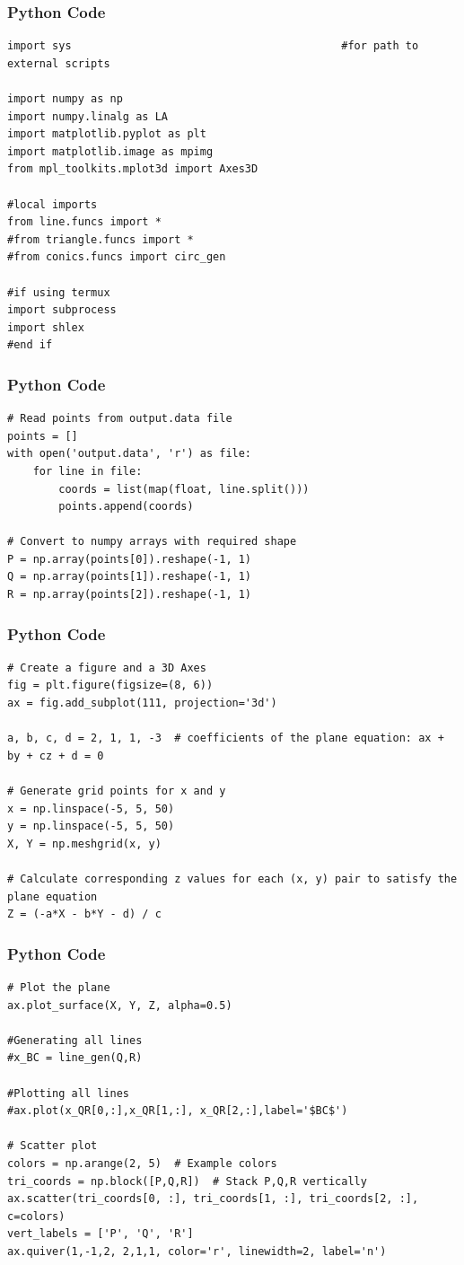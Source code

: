 \documentclass{beamer}
\begin{document}
\begin{frame}[fragile]
    \frametitle{Python Code}
    \begin{lstlisting}
import sys                                          #for path to external scripts

import numpy as np
import numpy.linalg as LA
import matplotlib.pyplot as plt
import matplotlib.image as mpimg
from mpl_toolkits.mplot3d import Axes3D

#local imports
from line.funcs import *
#from triangle.funcs import *
#from conics.funcs import circ_gen

#if using termux
import subprocess
import shlex
#end if
    \end{lstlisting}
\end{frame}

\begin{frame}[fragile]
    \frametitle{Python Code}
    \begin{lstlisting}
# Read points from output.data file
points = []
with open('output.data', 'r') as file:
    for line in file:
        coords = list(map(float, line.split()))
        points.append(coords)

# Convert to numpy arrays with required shape
P = np.array(points[0]).reshape(-1, 1)
Q = np.array(points[1]).reshape(-1, 1)
R = np.array(points[2]).reshape(-1, 1)

    \end{lstlisting}
\end{frame}

\begin{frame}[fragile]
    \frametitle{Python Code}
    \begin{lstlisting}
# Create a figure and a 3D Axes
fig = plt.figure(figsize=(8, 6))
ax = fig.add_subplot(111, projection='3d')

a, b, c, d = 2, 1, 1, -3  # coefficients of the plane equation: ax + by + cz + d = 0

# Generate grid points for x and y
x = np.linspace(-5, 5, 50)
y = np.linspace(-5, 5, 50)
X, Y = np.meshgrid(x, y)

# Calculate corresponding z values for each (x, y) pair to satisfy the plane equation
Z = (-a*X - b*Y - d) / c

    \end{lstlisting}
\end{frame}

\begin{frame}[fragile]
    \frametitle{Python Code}
    \begin{lstlisting}
# Plot the plane
ax.plot_surface(X, Y, Z, alpha=0.5)

#Generating all lines
#x_BC = line_gen(Q,R)

#Plotting all lines
#ax.plot(x_QR[0,:],x_QR[1,:], x_QR[2,:],label='$BC$')

# Scatter plot
colors = np.arange(2, 5)  # Example colors
tri_coords = np.block([P,Q,R])  # Stack P,Q,R vertically
ax.scatter(tri_coords[0, :], tri_coords[1, :], tri_coords[2, :], c=colors)
vert_labels = ['P', 'Q', 'R']
ax.quiver(1,-1,2, 2,1,1, color='r', linewidth=2, label='n')
    \end{lstlisting}
\end{frame}
\end{document}
